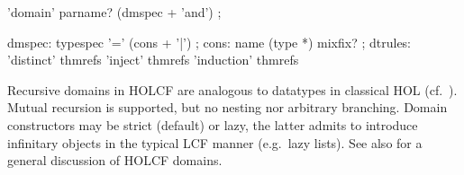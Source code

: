 \begin{isabellebody}
\begin{isamarkuptext}
  \begin{rail}
    'domain' parname? (dmspec + 'and')
    ;

    dmspec: typespec '=' (cons + '|')
    ;
    cons: name (type *) mixfix?
    ;
    dtrules: 'distinct' thmrefs 'inject' thmrefs 'induction' thmrefs
  \end{rail}

  Recursive domains in HOLCF are analogous to datatypes in classical
  HOL (cf.\ ).  Mutual recursion is
  supported, but no nesting nor arbitrary branching.  Domain
  constructors may be strict (default) or lazy, the latter admits to
  introduce infinitary objects in the typical LCF manner (e.g.\ lazy
  lists).  See also \cite{MuellerNvOS99} for a general discussion of
  HOLCF domains.%
\end{isamarkuptext}%
\isamarkuptrue%
%
\isadelimtheory
%
\endisadelimtheory
%
\isatagtheory
{}\isamarkupfalse%
%
\endisatagtheory
{\isafoldtheory}%
%
\isadelimtheory
%
\endisadelimtheory
\isanewline
\end{isabellebody}%
